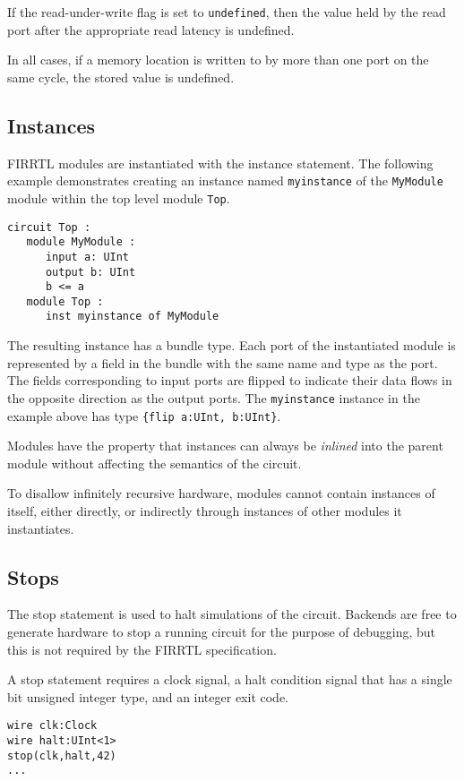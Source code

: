 \documentclass[12pt]{article}
\begin{document}
If the read-under-write flag is set to \verb|undefined|, then the value held by the read port after the appropriate read latency is undefined.

In all cases, if a memory location is written to by more than one port on the same cycle, the stored value is undefined.

\subsection{Instances}\label{instances}
FIRRTL modules are instantiated with the instance statement. The following example demonstrates creating an instance named \verb|myinstance| of the \verb|MyModule| module within the top level module \verb|Top|. 

\begin{lstlisting}
circuit Top :
   module MyModule :
      input a: UInt
      output b: UInt
      b <= a
   module Top :
      inst myinstance of MyModule   
\end{lstlisting}

The resulting instance has a bundle type. Each port of the instantiated module is represented by a field in the bundle with the same name and type as the port. The fields corresponding to input ports are flipped to indicate their data flows in the opposite direction as the output ports. The \verb|myinstance| instance in the example above has type \verb|{flip a:UInt, b:UInt}|.

Modules have the property that instances can always be {\em inlined} into the parent module without affecting the semantics of the circuit.

To disallow infinitely recursive hardware, modules cannot contain instances of itself, either directly, or indirectly through instances of other modules it instantiates. 

\subsection{Stops}
The stop statement is used to halt simulations of the circuit. Backends are free to generate hardware to stop a running circuit for the purpose of debugging, but this is not required by the FIRRTL specification.

A stop statement requires a clock signal, a halt condition signal that has a single bit unsigned integer type, and an integer exit code.

\begin{lstlisting}
wire clk:Clock
wire halt:UInt<1>
stop(clk,halt,42)
...
\end{lstlisting}
\end{document}
